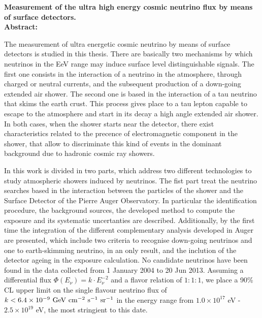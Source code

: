 \begin{titlepage}

$\,$\\[2.5cm]
\textbf{\Large  Measurement of the ultra high energy cosmic neutrino flux by means of surface detectors.}\\[2.5cm]

\noindent
\textbf{Abstract: } 

The measurement of ultra energetic cosmic neutrino by means of surface detectors is studied in this thesis. 
There are basically two mechanisms by which neutrinos in the EeV range may induce surface level distinguishable signals.
The first one consists in the interaction of a neutrino in the atmosphere, through charged or neutral currents, and the subsequent production of a down-going extended air shower.
The second one is based in the interaction of a tau neutrino that skims the earth crust.
This process gives place to a tau lepton capable to escape to the atmosphere and start in its decay a high angle extended air shower.
In both cases, when the shower starts near the detector, there exist characteristics related to the precence of electromagnetic component in the shower, that allow to discriminate this kind of events in the dominant background due to hadronic cosmic ray showers.

In this work is divided in two parts, which address two different technologies to study atmospheric showers induced by neutrinos.
The fist part treat the neutrino searches based in the interaction between the particles of the shower and the Surface Detector of the Pierre Auger Observatory.
In particular the identification procedure, the background sources, the developed method to compute the exposure and its systematic uncertanties are described.
Additionally, by the first time the integration of the different complementary analysis developed in Auger are presented, which include two criteria to recognise down-going neutrinos and one to earth-skimming neutrino, in an only result, and the inclution of the detector ageing in the exposure calculation.
No candidate neutrinos have been found in the data collected from 1 January 2004 to 20 Jun 2013. 
Assuming a differential flux $\Phi(E_\nu) = k\cdot E_\nu^{-2}$ and a flavor relation of $1:1:1$, we place a 90\% CL upper limit on the single flavour neutrino flux of $k < 6.4 \times 10^{-9}~{\rm GeV~cm^{-2}~s^{-1}~sr^{-1}}$ in the energy range from ${1.0 \times 10^{17}}$ {eV} - ${2.5 \times 10^{19}}$ {eV}, the most stringient to this date.


\end{titlepage}
